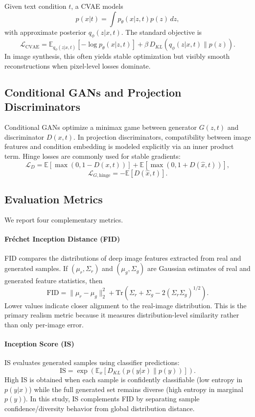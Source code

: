 \documentclass[11pt]{article}
\begin{document}
Given text condition $t$, a CVAE models
\[
p(x|t) = \int p_\theta(x|z,t)p(z)\,dz,
\]
with approximate posterior $q_\phi(z|x,t)$. The standard objective is
\[
\mathcal{L}_{\mathrm{CVAE}} = \mathbb{E}_{q_\phi(z|x,t)}[-\log p_\theta(x|z,t)] + \beta\,D_{KL}(q_\phi(z|x,t)\|p(z)).
\]
In image synthesis, this often yields stable optimization but visibly smooth reconstructions when pixel-level losses dominate.

\subsection{Conditional GANs and Projection Discriminators}

Conditional GANs optimize a minimax game between generator $G(z,t)$ and discriminator $D(x,t)$. In projection discriminators, compatibility between image features and condition embedding is modeled explicitly via an inner product term. Hinge losses are commonly used for stable gradients:
\[
\mathcal{L}_D = \mathbb{E}[\max(0,1-D(x,t))] + \mathbb{E}[\max(0,1+D(\hat{x},t))],
\]
\[
\mathcal{L}_{G,\mathrm{hinge}} = -\mathbb{E}[D(\hat{x},t)].
\]

\subsection{Evaluation Metrics}

We report four complementary metrics.

\paragraph{Fr\'echet Inception Distance (FID)}
FID compares the distributions of deep image features extracted from real and generated samples. If $(\mu_r, \Sigma_r)$ and $(\mu_g, \Sigma_g)$ are Gaussian estimates of real and generated feature statistics, then
\[
\mathrm{FID} = \|\mu_r-\mu_g\|_2^2 + \mathrm{Tr}\left(\Sigma_r + \Sigma_g - 2(\Sigma_r\Sigma_g)^{1/2}\right).
\]
Lower values indicate closer alignment to the real-image distribution. This is the primary realism metric because it measures distribution-level similarity rather than only per-image error.

\paragraph{Inception Score (IS)}
IS evaluates generated samples using classifier predictions:
\[
\mathrm{IS} = \exp\left(\mathbb{E}_x\left[D_{KL}(p(y|x)\|p(y))\right]\right).
\]
High IS is obtained when each sample is confidently classifiable (low entropy in $p(y|x)$) while the full generated set remains diverse (high entropy in marginal $p(y)$). In this study, IS complements FID by separating sample confidence/diversity behavior from global distribution distance.
\end{document}
